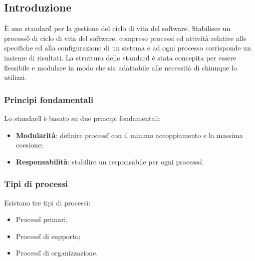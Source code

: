 \subsection{Introduzione}
È uno standard\G{} per la gestione del ciclo di vita del software. Stabilisce un processo\G{} di ciclo di vita del software, compreso processi ed attività relative alle specifiche ed alla configurazione di un sistema e ad ogni processo corrisponde un insieme di risultati.
La struttura dello standard\G{} è stata concepita per essere flessibile e modulare in modo che sia adattabile alle necessità di chiunque lo utilizzi.

\subsubsection{Principi fondamentali}
Lo standard\G{} è basato su due principi fondamentali:
\begin{itemize}
	\item \textbf{Modularità}: definire processi\G{} con il minimo accoppiamento e la massima coesione;
	\item \textbf{Responsabilità}: stabilire un responsabile per ogni processo\G.
\end{itemize}

\subsubsection{Tipi di processi}
Esistono tre tipi di processi:
\begin{itemize}
	\item Processi\G{} primari;
	\item Processi\G{} di supporto;
	\item Processi\G{} di organizzazione.
\end{itemize}
